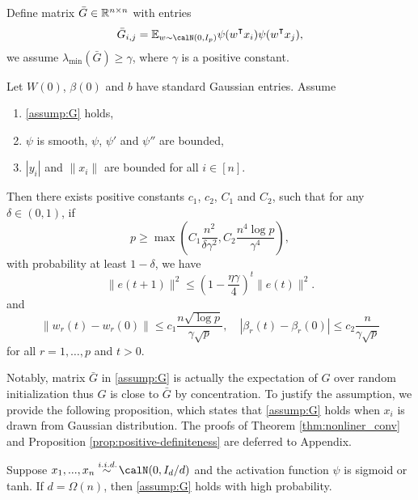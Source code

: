\begin{assumption}\label{assump:G}
Define matrix $\bar{G} \in \mathbb{R}^{n\times n}$ with entries
\begin{equation*}
    \bar{G}_{i,j} = \E_{w\sim \calN(0,I_p)}\psi(w\transpose x_i) \psi(w\transpose  x_j),
\end{equation*}
we assume $\lambda_{\min}(\bar{G}) \geq \gamma$, where $\gamma$ is a positive constant.
\end{assumption}

\begin{theorem}\label{thm:nonliner_conv}
Let $W(0)$, $\beta(0)$ and $b$ have \iid standard Gaussian entries. Assume
\begin{enumerate}
    \item \cref{assump:G} holds,
    \item $\psi$ is smooth, $\psi$, $\psi'$ and $\psi''$ are bounded,
    \item $|y_i|$ and $\|x_i\|$ are bounded for all $i\in[n]$.
\end{enumerate}
Then there exists positive constants $c_1$, $c_2$, $C_1$ and $C_2$, such that for any $\delta\in(0,1)$, if 
\begin{equation*}
    p \geq \max(C_1\frac{n^2}{\delta\gamma^2}, C_2\frac{n^4\log p}{\gamma^4}),
\end{equation*}
with probability at least $1-\delta$, we have
\begin{equation}\label{eq:conv}
    \|e(t+1)\|^2 \leq (1-\frac{\eta\gamma}{4})^t\|e(t)\|^2.
\end{equation}
and 
\begin{equation}
\label{eq:weights}
    \|w_r(t)-w_r(0)\| \leq c_1\frac{n\sqrt{\log p}}{\gamma\sqrt p}, \quad |\beta_r(t)-\beta_r(0)| \leq c_2\frac{n}{\gamma\sqrt p}
\end{equation}
for all $r=1,\ldots, p$ and $t>0$.
\end{theorem}

Notably, matrix $\bar{G}$ in \cref{assump:G} is actually the expectation of $G$ over random initialization thus $G$ is close to $\bar{G}$ by concentration. To justify the assumption, we provide the following proposition, which states that \cref{assump:G} holds when $x_i$ is drawn from Gaussian distribution. The proofs of Theorem \ref{thm:nonliner_conv} and Proposition \ref{prop:positive-definiteness} are deferred to Appendix.

\begin{proposition}\label{prop:positive-definiteness}
Suppose $x_1,...,x_n \overset{\iid}{\sim} \calN(0,I_d/d)$ and the activation function $\psi$ is sigmoid or tanh. If $d=\Omega(n)$, then \cref{assump:G} holds with high probability.
\end{proposition}




